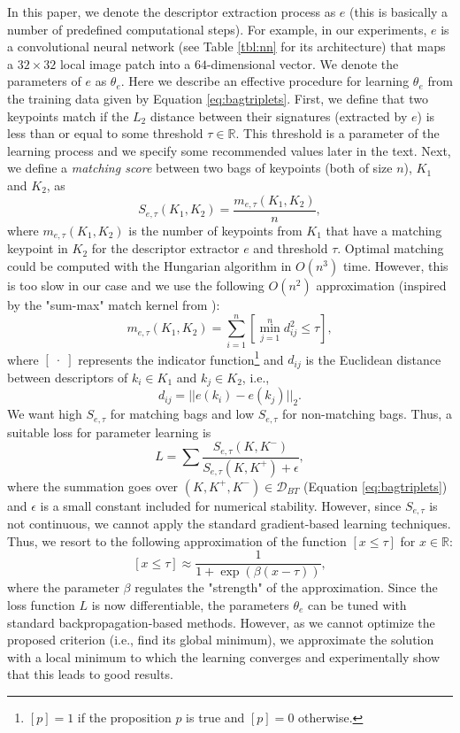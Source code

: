 \documentclass[10pt,conference,a4paper]{IEEEtran}
\begin{document}
		In this paper, we denote the descriptor extraction process as $e$ (this is basically a number of predefined computational steps).
		For example, in our experiments, $e$ is a convolutional neural network (see Table \ref{tbl:nn} for its architecture) that maps a $32\times 32$ local image patch into a $64$-dimensional vector.
		We denote the parameters of $e$ as $\theta_e$.
		Here we describe an effective procedure for learning $\theta_e$ from the training data given by Equation \eqref{eq:bagtriplets}.
		First, we define that two keypoints match if the $L_2$ distance between their signatures (extracted by $e$) is less than or equal to some threshold $\tau\in\mathbb{R}$.
		This threshold is a parameter of the learning process and we specify some recommended values later in the text.
		Next, we define a \emph{matching score} between two bags of keypoints (both of size $n$), $K_1$ and $K_2$, as
		\begin{equation}\label{eq:bagsim}
			S_{e, \tau}(K_1, K_2)=
			\frac{m_{e, \tau}(K_1, K_2)}{n}
			,
		\end{equation}
		where $m_{e, \tau}(K_1, K_2)$ is the number of keypoints from $K_1$ that have a matching keypoint in $K_2$ for the descriptor extractor $e$ and threshold $\tau$.
		Optimal matching could be computed with the Hungarian algorithm in $O(n^3)$ time.
		However, this is too slow in our case and we use the following $O(n^2)$ approximation
		(inspired by the "sum-max" match kernel from \cite{summax}):
		$$
			m_{e, \tau}(K_1, K_2)=
			\sum_{i=1}^n \left[ \min_{j=1}^n d_{ij}^2 \leq \tau \right]
			,
		$$
		where $[\;\cdot\;]$ represents the indicator function\footnote{$[p]=1$ if the proposition $p$ is true and $[p]=0$ otherwise.} and $d_{ij}$ is the Euclidean distance between descriptors of $k_i\in K_1$ and $k_j\in K_2$, i.e.,
		$$
			d_{ij} =
			|| e(k_i) - e(k_j) ||_2
			.
		$$
		We want high $S_{e, \tau}$ for matching bags and low $S_{e, \tau}$ for non-matching bags.
		Thus, a suitable loss for parameter learning is
		\begin{equation}\label{eq:loss}
			L=
			\sum\frac{S_{e, \tau}(K, K^-)}{S_{e, \tau}(K, K^+) + \epsilon}
			,
		\end{equation}
		where the summation goes over $(K, K^+, K^-)\in\mathcal{D}_{BT}$ (Equation \eqref{eq:bagtriplets}) and $\epsilon$ is a small constant included for numerical stability.
		However, since $S_{e, \tau}$ is not continuous, we cannot apply the standard gradient-based learning techniques.
		Thus, we resort to the following approximation of the function $[x\leq\tau]$ for $x\in\mathbb{R}$:
		$$
			[x\leq\tau]\approx
			\frac{1}{1 + \exp(\beta(x-\tau))}
			,
		$$
		where the parameter $\beta$ regulates the "strength" of the approximation.
		Since the loss function $L$ is now differentiable, the parameters $\theta_e$ can be tuned with standard backpropagation-based methods.
		However, as we cannot optimize the proposed criterion (i.e., find its global minimum), we approximate the solution with a local minimum to which the learning converges and experimentally show that this leads to good results.
\end{document}
